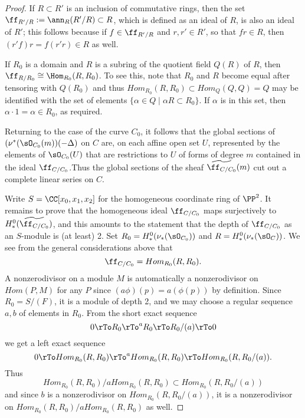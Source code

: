 \begin{proof}
If $R\subset R'$ is an inclusion of commutative rings, then the set
$\ff_{R'/R} := \ann_{R}(R'/R)\subset R$, which is defined as an ideal of $R$, is also an ideal of $R'$; this follows
because if $f\in \ff_{R'/R} $ and $r, r'\in R'$, so that $fr \in R$, then $(r'f)r = f(r'r) \in R$ as well. 

If $R_{0}$ is a domain and $R$ is a subring of the quotient field $Q(R)$ of $R$, then
 $\ff_{R/R_{0}} \cong \Hom_{R_{0}}(R, R_{0})$. To see this, note that $R_{0}$ and $R$ become
 equal after tensoring with $Q(R_{0})$ and thus 
 $Hom_{R_{0}}(R,R_{0}) \subset Hom_{Q}(Q,Q) = Q$ 
 may be identified
 with the set of elements $\{\alpha\in Q\mid \alpha R \subset R_{0}\}$. If $\alpha$ is in this set, then
  $\alpha\cdot 1 = \alpha \in R_{0}$, as required.
  
Returning to the case of the curve $C_{0}$, it follows that the global sections of $(\nu^{*}(\sO_{C_{0}}(m))( -\Delta)$ on $C$
are, on each affine open set $U$, represented by the elements of $\sO_{C_{0}}(U)$ that  are restrictions to $U$
of forms of degree $m$ contained in 
the ideal $\ff_{C/C_{0}}$.Thus
the global sections of the sheaf $\widetilde{\ff_{C/C_{0}}}(m)$ cut out a complete linear series on $C$.

Write $S =\CC[x_{0}, x_{1}, x_{2}]$ for the homogeneous coordinate ring of $\PP^{2}$.
It remains to prove that the homogeneous ideal $\ff_{C/C_{0}}$ maps
surjectively to $H^{0}_{*}(\widetilde{\ff_{C/C_{0}}})$, and this amounts to the
statement that the depth of $\ff_{C/C_{0}}$ as an $S$-module is (at least) 2.
Set $R_{0} = H^{0}_{*}(\nu_{*} (\sO_{C_{0}}))$ and $R = H^{0}_{*}(\nu_{*} (\sO_{C}))$.
We see from the general considerations above that
$$
\ff_{C/C_{0}} = Hom_{R_{0}}(R, R_{0}).
$$ 
A nonzerodivisor on a module $M$
is automatically a nonzerodivisor on $Hom(P, M)$ for any $P$ since $(a\phi)(p) = a(\phi(p))$ by definition. 
Since $R_{0} = S/(F)$, it is a module of depth 2, and we may choose a regular sequence
$a,b$ of elements in $R_{0}$. From the short exact sequence
$$
0\rTo R_{0}\rTo^{a} R_{0}\rTo R_{0}/(a) \rTo 0
$$
we get a left exact sequence
$$
0\rTo Hom_{R_{0}}(R,R_{0})\rTo^{a} Hom_{R_{0}}(R,R_{0})\rTo Hom_{R_{0}}(R,R_{0}/(a)).
$$
Thus 
$$
Hom_{R_{0}}(R,R_{0})/aHom_{R_{0}}(R,R_{0}) \subset Hom_{R_{0}}(R,R_{0}/(a))
$$
and since $b$ is a nonzerodivisor on $Hom_{R_{0}}(R,R_{0}/(a))$, it is a nonzerodivisor
on $Hom_{R_{0}}(R,R_{0})/aHom_{R_{0}}(R,R_{0})$ as well.
\end{proof}

